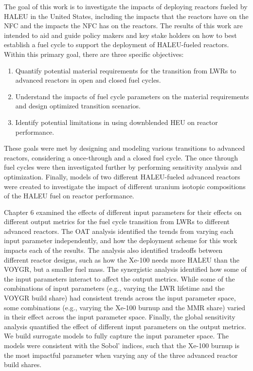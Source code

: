 

The goal of this work is to investigate the impacts of deploying reactors 
fueled 
by \gls{HALEU} in the United States, including the impacts that the reactors 
have on the \gls{NFC} and the impacts the \gls{NFC} has on the reactors. 
The results of this work are intended to
aid and guide policy makers and key stake holders on how to best establish a 
fuel cycle to support the deployment of \gls{HALEU}-fueled reactors. 
Within this primary goal, there are three specific objectives:
\vspace{0.2cm} 
\noindent
\begin{enumerate}
\item Quantify potential material requirements for the transition 
from \glspl{LWR} to advanced reactors in open and closed 
fuel cycles.

\item Understand the impacts of fuel cycle parameters on the material 
requirements and design optimized transition scenarios.

\item Identify potential limitations in using downblended \gls{HEU} 
on reactor performance.

\end{enumerate}

These goals were met by designing and modeling various transitions 
to advanced reactors, considering a once-through and a closed 
fuel cycle. The once through fuel cycles were then investigated 
further by performing sensitivity analysis and optimization. Finally, 
models of two different \gls{HALEU}-fueled advanced reactors were 
created to investigate the impact of different uranium isotopic 
compositions of the \gls{HALEU} fuel on reactor performance. 



Chapter 6 examined the effects of different input parameters for 
their effects on different output metrics for the fuel cycle transition from 
\glspl{LWR} to different advanced reactors. The \gls{OAT} analysis identified the 
trends from varying each input parameter independently, and how the deployment 
scheme for this work impacts each of the results. The analysis also 
identified tradeoffs between different reactor designs, such as how the Xe-100 
needs more \gls{HALEU} than the VOYGR, but a smaller fuel mass. The synergistic 
analysis identified how some of the input parameters interact to affect the output 
metrics. While some of the combinations of input parameters (e.g., varying 
the \gls{LWR} lifetime and the VOYGR build share) had consistent trends 
across the input parameter space, some combinations (e.g., varying the Xe-100 
burnup and the \gls{MMR} share) varied in their effect across the input parameter 
space. Finally, the global sensitivity analysis quantified the effect of different 
input parameters on the output metrics. We build surrogate models to fully capture 
the input parameter space. The models were consistent with the Sobol' indices, 
such that the Xe-100 burnup is the most impactful parameter when varying any 
of the three advanced reactor build shares. 


